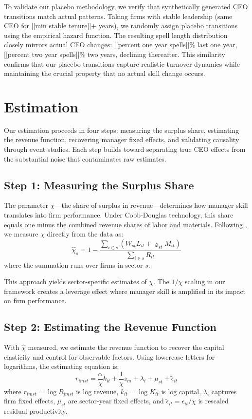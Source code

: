 \documentclass[11pt,a4paper]{article}
\begin{document}
To validate our placebo methodology, we verify that synthetically generated CEO transitions match actual patterns. Taking firms with stable leadership (same CEO for [[min stable tenure]]+ years), we randomly assign placebo transitions using the empirical hazard function. The resulting spell length distribution closely mirrors actual CEO changes: [[percent one year spells]]\% last one year, [[percent two year spells]]\% two years, declining thereafter. This similarity confirms that our placebo transitions capture realistic turnover dynamics while maintaining the crucial property that no actual skill change occurs.

\section{Estimation}

Our estimation proceeds in four steps: measuring the surplus share, estimating the revenue function, recovering manager fixed effects, and validating causality through event studies. Each step builds toward separating true CEO effects from the substantial noise that contaminates raw estimates.

\subsection{Step 1: Measuring the Surplus Share}

The parameter $\chi$—the share of surplus in revenue—determines how manager skill translates into firm performance. Under Cobb-Douglas technology, this share equals one minus the combined revenue shares of labor and materials. Following \citet{Gandhi2020-nu}, we measure $\chi$ directly from the data as:
\begin{equation}
\hat{\chi}_s = 1 - \frac{\sum_{i \in s}(W_{st}L_{it} + \varrho_{st}M_{it})}{\sum_{i \in s} R_{it}}
\end{equation}
where the summation runs over firms in sector $s$.

This approach yields sector-specific estimates of $\chi$. The $1/\chi$ scaling in our framework creates a leverage effect where manager skill is amplified in its impact on firm performance.

\subsection{Step 2: Estimating the Revenue Function}

With $\hat{\chi}$ measured, we estimate the revenue function to recover the capital elasticity and control for observable factors. Using lowercase letters for logarithms, the estimating equation is:
\begin{equation}
r_{imst} = \frac{\alpha}{\chi} k_{it} + \frac{1}{\chi}z_m + \lambda_i + \mu_{st} + \tilde{\epsilon}_{it}
\end{equation}
where $r_{imst} = \log R_{imst}$ is log revenue, $k_{it} = \log K_{it}$ is log capital, $\lambda_i$ captures firm fixed effects, $\mu_{st}$ are sector-year fixed effects, and $\tilde{\epsilon}_{it} = \epsilon_{it}/\chi$ is rescaled residual productivity.
\end{document}
